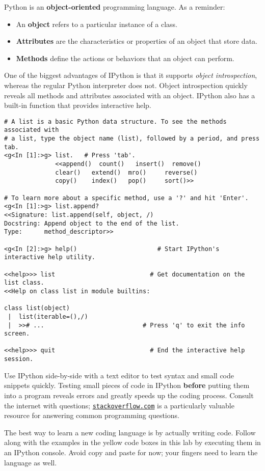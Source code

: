 \noindent Python is an \textbf{object-oriented} programming language. As a reminder:
\begin{itemize}
	\item An \textbf{object} refers to a particular instance of a class.
	\item \textbf{Attributes} are the characteristics or properties of an object that store data.
	\item \textbf{Methods} define the actions or behaviors that an object can perform.
\end{itemize}
One of the biggest advantages of IPython is that it supports \emph{object introspection}, whereas the regular Python interpreter does not. 
Object introspection quickly reveals all methods and attributes associated with an object.
IPython also has a built-in  function that provides interactive help.

\begin{lstlisting}
# A list is a basic Python data structure. To see the methods associated with
# a list, type the object name (list), followed by a period, and press tab.
<g<In [1]:>g> list.   # Press 'tab'.
              <<append()  count()   insert()  remove()
              clear()   extend()  mro()     reverse()
              copy()    index()   pop()     sort()>>

# To learn more about a specific method, use a '?' and hit 'Enter'.
<g<In [1]:>g> list.append?
<<Signature: list.append(self, object, /)
Docstring: Append object to the end of the list.
Type:      method_descriptor>>

<g<In [2]:>g> help()                      # Start IPython's interactive help utility.

<<help>>> list                          # Get documentation on the list class.
<<Help on class list in module builtins:

class list(object)
 |  list(iterable=(),/)
 |  >># ...                           # Press 'q' to exit the info screen.

<<help>>> quit                          # End the interactive help session.
\end{lstlisting}

\begin{info}
Use IPython side-by-side with a text editor to test syntax and small code snippets quickly.
Testing small pieces of code in IPython \textbf{before} putting them into a program reveals errors and greatly speeds up the coding process.
Consult the internet with questions; \href{http://stackoverflow.com/}{\texttt{stackoverflow.com}} is a particularly valuable resource for answering common programming questions.

The best way to learn a new coding language is by actually writing code.
Follow along with the examples in the yellow code boxes in this lab by executing them in an IPython console.
Avoid copy and paste for now; your fingers need to learn the language as well.
\end{info}

